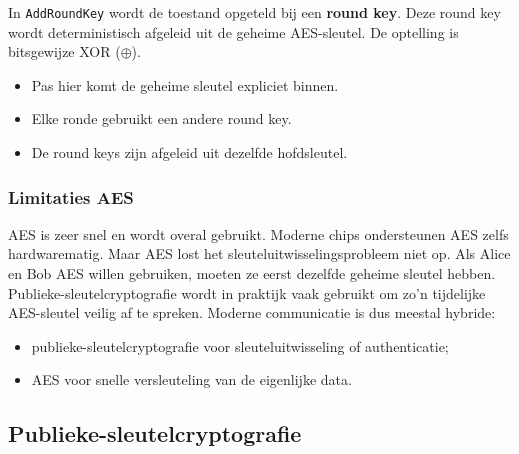 In \texttt{AddRoundKey} wordt de toestand opgeteld bij een \textbf{round key}. Deze round key wordt deterministisch afgeleid uit de geheime AES-sleutel. De optelling is bitsgewijze XOR ($\oplus$).
\begin{itemize}
    \item Pas hier komt de geheime sleutel expliciet binnen.
    \item Elke ronde gebruikt een andere round key.
    \item De round keys zijn afgeleid uit dezelfde hofdsleutel.
\end{itemize}

\begin{center}
\resizebox{1.0\textwidth}{!}{%
    
}
\end{center}

\subsubsection{Limitaties AES}

AES is zeer snel en wordt overal gebruikt. Moderne chips ondersteunen AES zelfs hardwarematig. Maar AES lost het sleuteluitwisselingsprobleem niet op. Als Alice en Bob AES willen gebruiken, moeten ze eerst dezelfde geheime sleutel hebben. Publieke-sleutelcryptografie wordt in praktijk vaak gebruikt om zo'n tijdelijke AES-sleutel veilig af te spreken. Moderne communicatie is dus meestal hybride:
\begin{itemize}
    \item publieke-sleutelcryptografie voor sleuteluitwisseling of authenticatie;
    \item AES voor snelle versleuteling van de eigenlijke data.
\end{itemize}

\subsection{Publieke-sleutelcryptografie}

